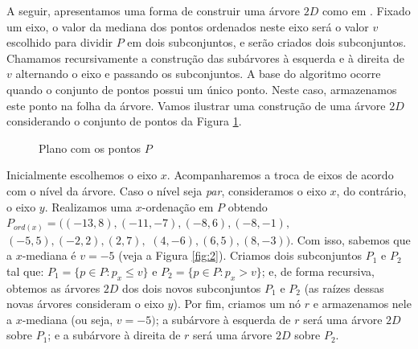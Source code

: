 A seguir, apresentamos uma forma de construir uma árvore $2D$ como em \cite{cg08}.
Fixado um eixo, o valor da mediana dos pontos ordenados neste eixo será o valor $v$ escolhido para dividir $P$ em dois subconjuntos, e serão criados dois subconjuntos. Chamamos recursivamente a construção das subárvores à esquerda e à direita de $v$ alternando o eixo e passando os subconjuntos. A base do algoritmo ocorre quando o conjunto de pontos possui um único ponto. Neste caso, armazenamos este ponto na folha da árvore.  Vamos ilustrar uma construção de uma árvore $2D$ considerando o conjunto de pontos da Figura \ref{fig:1}.
\begin{figure}[h!]
    \centering
    \caption{Plano com os pontos $P$}
    \label{fig:1}
\end{figure}

Inicialmente escolhemos o eixo $x$. Acompanharemos a troca de eixos de acordo com o nível da árvore. Caso o nível seja \emph{par}, consideramos o eixo $x$, do contrário, o eixo $y$.
Realizamos uma $x$-ordenação em $P$ obtendo $P_{ord(x)} = ((-13,8), (-11,-7), (-8,6), (-8,-1),$ $(-5,5), (-2, 2), (2,7),$ $ (4,-6),(6,5),(8,-3))$. Com isso, sabemos que a $x$-mediana é $v = -5$ (veja a Figura \ref{fig:2}). Criamos dois subconjuntos $P_1$ e $P_2$ tal que: $P_1 = \{p \in P : p_x \leq v\}$ e $P_2 = \{p \in P : p_x > v\}$; e, de forma recursiva, obtemos as árvores $2D$ dos dois novos subconjuntos $P_1$ e $P_2$ (as raízes dessas novas árvores consideram o eixo $y$). Por fim, criamos um nó $r$ e armazenamos nele a $x$-mediana (ou seja, $v=-5)$; a subárvore à esquerda de $r$ será uma árvore $2D$ sobre $P_1$; e a subárvore à direita de $r$ será uma árvore $2D$ sobre $P_2$. %

